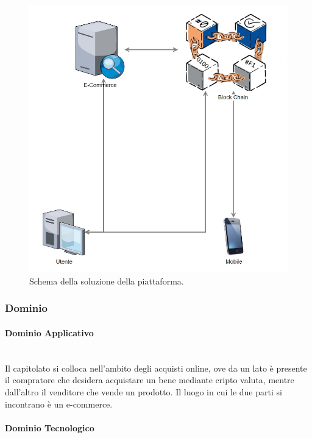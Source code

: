 \documentclass[11pt]{article}
\begin{document}
    \begin{figure}[h!]
        \centering
        \includegraphics[scale=0.4]{Res/SyncLab.png}
        \caption{Schema della soluzione della piattaforma.}
        \label{SyncLab}
    \end{figure}
    
    \subsubsection{Dominio}
        \paragraph{Dominio Applicativo}~\\
        
        \noindent
        Il capitolato si colloca nell'ambito degli acquisti online, ove da un lato è presente il compratore che desidera acquistare un
        bene mediante cripto valuta, mentre dall'altro il venditore che vende un prodotto.
        Il luogo in cui le due parti si incontrano è un e-commerce.
        
        \paragraph{Dominio Tecnologico}~\\
        
\end{document}
